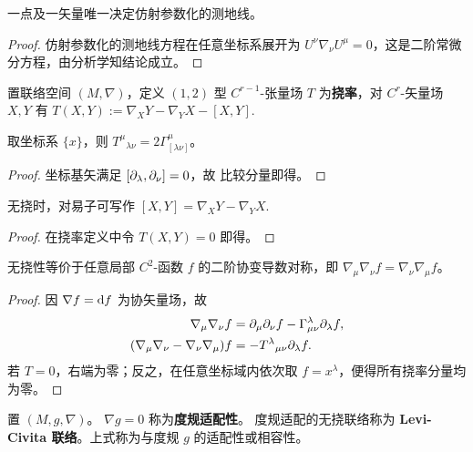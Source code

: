 \begin{theorem}
    一点及一矢量唯一决定仿射参数化的测地线。
\end{theorem}
\begin{proof}
    仿射参数化的测地线方程在任意坐标系展开为 $U^\nu \nabla_\nu U^\mu=0$，这是二阶常微分方程，由分析学知结论成立。
\end{proof}

\begin{definition}
    置联络空间 $(M,\nabla)$，定义 $(1,2)$ 型 $C^{r-1}$-张量场 $T$ 为\textbf{挠率}，对 $C^r$-矢量场 $X,Y$ 有 $T(X,Y):=\nabla_XY-\nabla_YX-[X,Y].$
\end{definition}

\begin{theorem}
    取坐标系 $\{x\}$，则 ${T^\mu}_{\lambda\nu}=2\Gamma^\mu_{[\lambda\nu]}$。
\end{theorem}
\begin{proof}
    坐标基矢满足 $[\partial_\lambda,\partial_\nu]=0$，故
    比较分量即得。
\end{proof}

\begin{theorem}
    无挠时，对易子可写作 $[X,Y]=\nabla_XY-\nabla_YX.$
\end{theorem}
\begin{proof}
    在挠率定义中令 $T(X,Y)=0$ 即得。
\end{proof}

\begin{theorem}
    无挠性等价于任意局部 $C^2$-函数 $f$ 的二阶协变导数对称，即 $\nabla_\mu\nabla_\nu f=\nabla_\nu\nabla_\mu f$。
\end{theorem}
\begin{proof}
    因 $\nabla f=\dd f$ 为协矢量场，故
    \begin{align*}
        \nabla_\mu\nabla_\nu f&=\partial_\mu\partial_\nu f-\Gamma^\lambda_{\mu\nu}\partial_\lambda f,\\
        (\nabla_\mu\nabla_\nu-\nabla_\nu\nabla_\mu)f&=-T^\lambda{}_{\mu\nu}\partial_\lambda f.
    \end{align*}
    若 $T=0$，右端为零；反之，在任意坐标域内依次取 $f=x^\lambda$，便得所有挠率分量均为零。
\end{proof}

\begin{definition}\label{def:levi-civita}
    置 $(M,g,\nabla)$。
    $\nabla g=0$ 称为\textbf{度规适配性}。
    度规适配的无挠联络称为 \textbf{Levi-Civita 联络}。上式称为与度规 $g$ 的适配性或相容性。
\end{definition}

